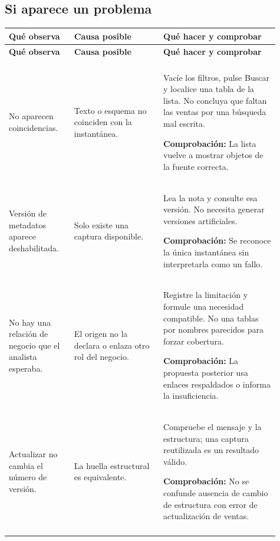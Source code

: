 \subsection{Si aparece un problema}
\begingroup
\fontsize{10}{12.5}\selectfont
\setlength{\tabcolsep}{5pt}
\renewcommand{\arraystretch}{1.15}
\begin{longtable}{@{}>{\RaggedRight\arraybackslash}p{0.22\linewidth}>{\RaggedRight\arraybackslash}p{0.3\linewidth}>{\RaggedRight\arraybackslash}p{0.39\linewidth}@{}}
\toprule
\textbf{Qué observa} & \textbf{Causa posible} & \textbf{Qué hacer y comprobar} \\
\midrule
\endfirsthead
\toprule
\textbf{Qué observa} & \textbf{Causa posible} & \textbf{Qué hacer y comprobar} \\
\midrule
\endhead
\midrule
\multicolumn{3}{r}{\footnotesize Continúa en la página siguiente}\\
\endfoot
\bottomrule
\endlastfoot
No aparecen coincidencias. & Texto o esquema no coinciden con la instantánea. & Vacíe los filtros, pulse Buscar y localice una tabla de la lista. No concluya que faltan las ventas por una búsqueda mal escrita.\par\smallskip\textbf{Comprobación:} La lista vuelve a mostrar objetos de la fuente correcta. \\
\addlinespace[3pt]
Versión de metadatos aparece deshabilitada. & Solo existe una captura disponible. & Lea la nota y consulte esa versión. No necesita generar versiones artificiales.\par\smallskip\textbf{Comprobación:} Se reconoce la única instantánea sin interpretarla como un fallo. \\
\addlinespace[3pt]
No hay una relación de negocio que el analista esperaba. & El origen no la declara o enlaza otro rol del negocio. & Registre la limitación y formule una necesidad compatible. No una tablas por nombres parecidos para forzar cobertura.\par\smallskip\textbf{Comprobación:} La propuesta posterior usa enlaces respaldados o informa la insuficiencia. \\
\addlinespace[3pt]
Actualizar no cambia el número de versión. & La huella estructural es equivalente. & Compruebe el mensaje y la estructura; una captura reutilizada es un resultado válido.\par\smallskip\textbf{Comprobación:} No se confunde ausencia de cambio de estructura con error de actualización de ventas. \\
\addlinespace[3pt]
\end{longtable}
\endgroup

